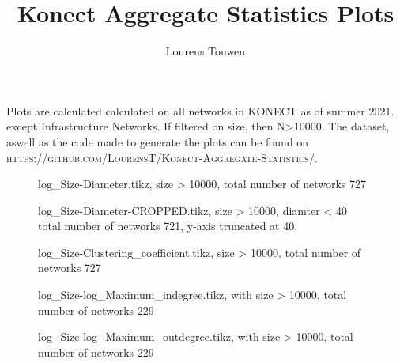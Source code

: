 \documentclass[fleqn]{article}
\title{Konect Aggregate Statistics Plots}
\author{Lourens Touwen}
\begin{document}
	
	\pagestyle{plain}
	
	\maketitle
	
	\newlength\fheight 
	\newlength\fwidth 
	\setlength{} 
	\setlength{}
	
	
	Plots are calculated calculated on all networks in KONECT as of summer 2021. except Infrastructure Networks. If filtered on size, then N>10000. The dataset, aswell as the code made to generate the plots can be found on \textsc{https://github.com/LourensT/Konect-Aggregate-Statistics/}.
	
	\begin{figure}[!htb]
		\centering
		
		\caption{log\_Size-Diameter.tikz, size > 10000, total number of networks 727}
	\end{figure}

	\begin{figure}[!htb]
		\centering
		
		\caption{log\_Size-Diameter-CROPPED.tikz, size > 10000, diamter < 40 total number of networks 721, y-axis truncated at 40.}
	\end{figure}

	\begin{figure}[!htb]
		\centering
		
		\caption{log\_Size-Clustering\_coefficient.tikz, size > 10000, total number of networks 727}
	\end{figure}
	
	\begin{figure}[!htb]
		\centering
		
		\caption{log\_Size-log\_Maximum\_indegree.tikz, with size > 10000, total number of networks 229}
	\end{figure}	

	\begin{figure}[!htb]
		\centering
		
		\caption{log\_Size-log\_Maximum\_outdegree.tikz, with size > 10000, total number of networks 229}
	\end{figure}	
\end{document}
